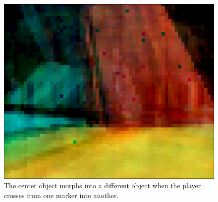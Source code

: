\begin{figure}[p]
  \includegraphics[width=\imgWithTripple, width=\imgWithTripple]{images/workflow/object_morphing/Morph4.png}
  \caption{The center object morphs into a different object when the player crosses from one marker into another.}
  \label{MorphingToOther}
\end{figure}
